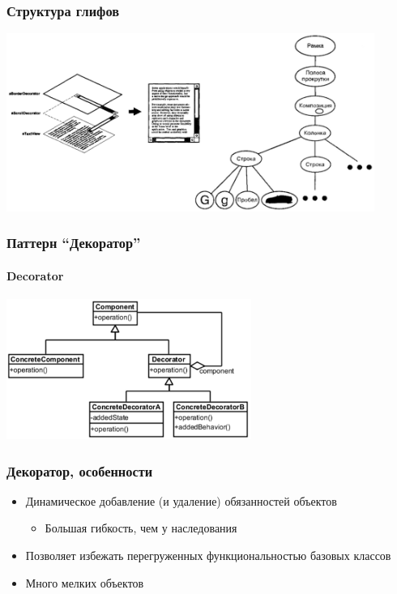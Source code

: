 \documentclass{../../slides-style}
\begin{document}
    \begin{frame}
        \frametitle{Структура глифов}
        \begin{center}
            \includegraphics[width=0.9\textwidth]{glyphStructure.png}
        \end{center}
    \end{frame}

    \begin{frame}
        \frametitle{Паттерн ``Декоратор''}
        \framesubtitle{Decorator}
        \begin{center}
            \includegraphics[width=0.6\textwidth]{decorator.png}
        \end{center}
    \end{frame}

    \begin{frame}
        \frametitle{Декоратор, особенности}
        \begin{itemize}
            \item Динамическое добавление (и удаление) обязанностей объектов
            \begin{itemize}
                \item Большая гибкость, чем у наследования
            \end{itemize}
            \item Позволяет избежать перегруженных функциональностью базовых классов
            \item Много мелких объектов
        \end{itemize}
    \end{frame}
\end{document}
